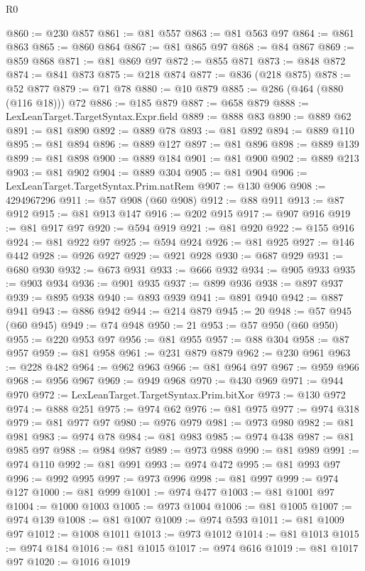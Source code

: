 \begin{lexlean}{R0}
\begin{coremodule}
@860 := @230 @857
@861 := @81 @557
@863 := @81 @563 @97
@864 := @861 @863
@865 := @860 @864
@867 := @81 @865 @97
@868 := @84 @867
@869 := @859 @868
@871 := @81 @869 @97
@872 := @855 @871
@873 := @848 @872
@874 := @841 @873
@875 := @218 @874
@877 := @836 (@218 @875)
@878 := @52 @877
@879 := @71 @78
@880 := @10 @879
@885 := @286 (@464 (@880 (@116 @18))) @72
@886 := @185 @879
@887 := @658 @879
@888 := LexLeanTarget.TargetSyntax.Expr.field
@889 := @888 @83
@890 := @889 @62
@891 := @81 @890
@892 := @889 @78
@893 := @81 @892
@894 := @889 @110
@895 := @81 @894
@896 := @889 @127
@897 := @81 @896
@898 := @889 @139
@899 := @81 @898
@900 := @889 @184
@901 := @81 @900
@902 := @889 @213
@903 := @81 @902
@904 := @889 @304
@905 := @81 @904
@906 := LexLeanTarget.TargetSyntax.Prim.natRem
@907 := @130 @906
@908 := 4294967296
@911 := @57 @908 (@60 @908)
@912 := @88 @911
@913 := @87 @912
@915 := @81 @913 @147
@916 := @202 @915
@917 := @907 @916
@919 := @81 @917 @97
@920 := @594 @919
@921 := @81 @920
@922 := @155 @916
@924 := @81 @922 @97
@925 := @594 @924
@926 := @81 @925
@927 := @146 @442
@928 := @926 @927
@929 := @921 @928
@930 := @687 @929
@931 := @680 @930
@932 := @673 @931
@933 := @666 @932
@934 := @905 @933
@935 := @903 @934
@936 := @901 @935
@937 := @899 @936
@938 := @897 @937
@939 := @895 @938
@940 := @893 @939
@941 := @891 @940
@942 := @887 @941
@943 := @886 @942
@944 := @214 @879
@945 := 20
@948 := @57 @945 (@60 @945)
@949 := @74 @948
@950 := 21
@953 := @57 @950 (@60 @950)
@955 := @220 @953 @97
@956 := @81 @955
@957 := @88 @304
@958 := @87 @957
@959 := @81 @958
@961 := @231 @879 @879
@962 := @230 @961
@963 := @228 @482
@964 := @962 @963
@966 := @81 @964 @97
@967 := @959 @966
@968 := @956 @967
@969 := @949 @968
@970 := @430 @969
@971 := @944 @970
@972 := LexLeanTarget.TargetSyntax.Prim.bitXor
@973 := @130 @972
@974 := @888 @251
@975 := @974 @62
@976 := @81 @975
@977 := @974 @318
@979 := @81 @977 @97
@980 := @976 @979
@981 := @973 @980
@982 := @81 @981
@983 := @974 @78
@984 := @81 @983
@985 := @974 @438
@987 := @81 @985 @97
@988 := @984 @987
@989 := @973 @988
@990 := @81 @989
@991 := @974 @110
@992 := @81 @991
@993 := @974 @472
@995 := @81 @993 @97
@996 := @992 @995
@997 := @973 @996
@998 := @81 @997
@999 := @974 @127
@1000 := @81 @999
@1001 := @974 @477
@1003 := @81 @1001 @97
@1004 := @1000 @1003
@1005 := @973 @1004
@1006 := @81 @1005
@1007 := @974 @139
@1008 := @81 @1007
@1009 := @974 @593
@1011 := @81 @1009 @97
@1012 := @1008 @1011
@1013 := @973 @1012
@1014 := @81 @1013
@1015 := @974 @184
@1016 := @81 @1015
@1017 := @974 @616
@1019 := @81 @1017 @97
@1020 := @1016 @1019

\end{coremodule}
\end{lexlean}
